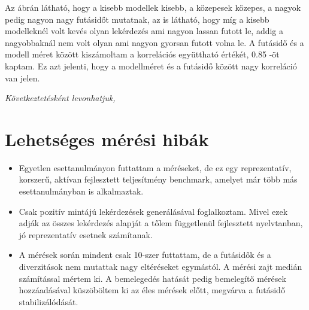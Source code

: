 Az ábrán látható, hogy a kisebb modellek kisebb, a közepesek közepes, a nagyok pedig nagyon nagy futásidőt mutatnak, az is látható, hogy míg a kisebb modelleknél volt kevés olyan lekérdezés ami nagyon lassan futott le, addig a nagyobbaknál nem volt olyan ami nagyon gyorsan futott volna le. A futásidő és a modell méret között kiszámoltam a korrelációs együttható értékét, 0.85 -öt kaptam. Ez azt jelenti, hogy a modellméret és a futásidő között nagy korreláció van jelen.

 
\textit{Következtetésként levonhatjuk, }



\section{Lehetséges mérési hibák}
\begin{itemize}
	\item Egyetlen esettanulmányon futtattam a méréseket, de ez egy reprezentatív, korszerű, aktívan fejlesztett teljesítmény benchmark, amelyet már több más esettanulmányban is alkalmaztak.\cite{garcia2017stress, bur2018distributed} 
	\item Csak pozitív mintájú lekérdezések generálásával foglalkoztam. Mivel ezek adják az összes lekérdezés alapját a tőlem függetlenül fejlesztett nyelvtanban, jó reprezentatív esetnek számítanak. 
	\item A mérések során mindent csak 10-szer futtattam, de a futásidők és a diverzitások nem mutattak nagy eltéréseket egymástól. A mérési zajt medián számítással mértem ki. A bemelegedés hatását pedig bemelegítő mérések hozzáadásával küszöböltem ki az éles mérések előtt, megvárva a futásidő stabilizálódását.	
\end{itemize}




